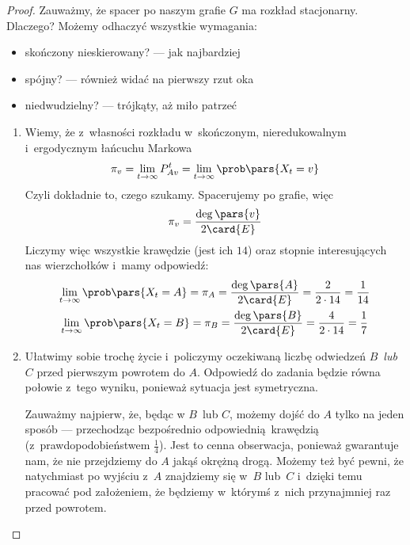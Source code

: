 \begin{proof} Zauważmy, że spacer po naszym grafie \(G\) ma rozkład stacjonarny. Dlaczego? Możemy odhaczyć wszystkie wymagania:
    \begin{itemize}
            \item skończony nieskierowany? --- jak najbardziej
            \item spójny? --- również widać na pierwszy rzut oka
            \item niedwudzielny? --- trójkąty, aż miło patrzeć
    \end{itemize}
    \begin{enumerate}[label=(\roman*)]
        \item Wiemy, że z~własności rozkładu w~skończonym, nieredukowalnym i~ergodycznym łańcuchu Markowa
            \begin{equation*}
                \pi_v = \lim_{t \to \infty} P_{Av}^t = \lim_{t \to \infty} \prob\pars{X_t = v}
            \end{equation*}
            Czyli dokładnie to, czego szukamy. Spacerujemy po grafie, więc
            \begin{equation*}
                \pi_v = \frac{\deg\pars{v}}{2\card{E}}
            \end{equation*}
            Liczymy więc wszystkie krawędzie (jest ich \(14\)) oraz stopnie interesujących nas wierzchołków i~mamy odpowiedź:
            \begin{gather*}
                \lim_{t \to \infty} \prob\pars{X_t = A}
                    = \pi_A
                    = \frac{\deg\pars{A}}{2\card{E}}
                    = \frac{2}{2 \cdot 14}
                    = \frac{1}{14}\\
                \lim_{t \to \infty} \prob\pars{X_t = B}
                    = \pi_B
                    = \frac{\deg\pars{B}}{2\card{E}}
                    = \frac{4}{2 \cdot 14}
                    = \frac{1}{7}
            \end{gather*}
        \item Ułatwimy sobie trochę życie i~policzymy oczekiwaną liczbę odwiedzeń \(B\)~\emph{lub} \(C\) przed pierwszym powrotem do \(A\). Odpowiedź do zadania będzie równa połowie z~tego wyniku, ponieważ sytuacja jest symetryczna.
        
            Zauważmy najpierw, że, będąc w \(B\)~lub \(C\), możemy dojść do \(A\) tylko na jeden sposób --- przechodząc bezpośrednio odpowiednią krawędzią (z~prawdopodobieństwem \(\frac{1}{4}\)). Jest to cenna obserwacja, ponieważ gwarantuje nam, że nie przejdziemy do \(A\) jakąś okrężną drogą. Możemy też być pewni, że natychmiast po wyjściu z~\(A\) znajdziemy się w~\(B\) lub~\(C\) i~dzięki temu pracować pod założeniem, że będziemy w~którymś z~nich przynajmniej raz przed powrotem.
            

\end{enumerate}
\end{proof}
